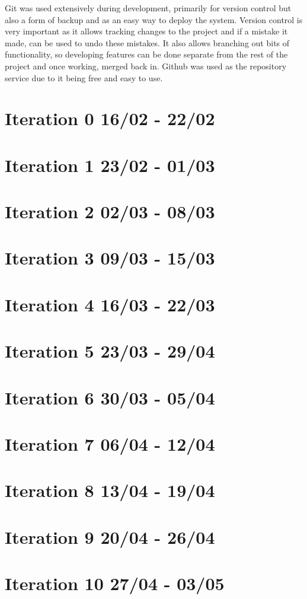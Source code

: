 Git was used extensively during development, primarily for version control but also a form of backup and as an easy way to deploy the system. Version control is very important as it allows tracking changes to the project and if a mistake it made, can be used to undo these mistakes. It also allows branching out bits of functionality, so developing features can be done separate from the rest of the project and once working, merged back in. Github was used as the repository service due to it being free and easy to use\cite{github}.
\newpage

\section{Iteration 0 16/02 - 22/02}


\section{Iteration 1 23/02 - 01/03}


\section{Iteration 2 02/03 - 08/03}


\section{Iteration 3 09/03 - 15/03}


\section{Iteration 4 16/03 - 22/03}


\section{Iteration 5 23/03 - 29/04}


\section{Iteration 6 30/03 - 05/04}


\section{Iteration 7 06/04 - 12/04}


\section{Iteration 8 13/04 - 19/04}


\section{Iteration 9 20/04 - 26/04}


\section{Iteration 10 27/04 - 03/05}


